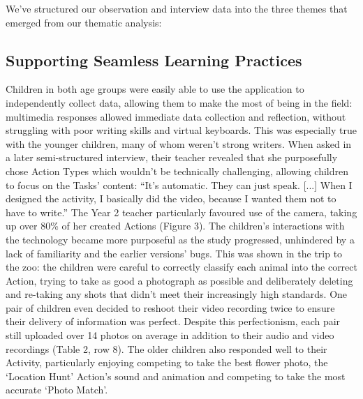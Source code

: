 We’ve structured our observation and interview data into the three themes that emerged from our thematic analysis:

\subsection{Supporting Seamless Learning Practices}

Children in both age groups were easily able to use the application to independently collect data, allowing them to make the most of being in the field: multimedia responses allowed immediate data collection and reflection, without struggling with poor writing skills and virtual keyboards. This was especially true with the younger children, many of whom weren’t strong writers. When asked in a later semi-structured interview, their teacher revealed that she purposefully chose Action Types which wouldn’t be technically challenging, allowing children to focus on the Tasks’ content: “It’s automatic. They can just speak. [...] When I designed the activity, I basically did the video, because I wanted them not to have to write.” The Year 2 teacher particularly favoured use of the camera, taking up over 80\% of her created Actions (Figure 3). The children’s interactions with the technology became more purposeful as the study progressed, unhindered by a lack of familiarity and the earlier versions’ bugs. This was shown in the trip to the zoo: the children were careful to correctly classify each animal into the correct Action, trying to take as good a photograph as possible and deliberately deleting and re-taking any shots that didn’t meet their increasingly high standards. One pair of children even decided to reshoot their video recording twice to ensure their delivery of information was perfect. Despite this perfectionism, each pair still uploaded over 14 photos on average in addition to their audio and video recordings (Table 2, row 8). The older children also responded well to their Activity, particularly enjoying competing to take the best flower photo, the ‘Location Hunt’ Action’s sound and animation and competing to take the most accurate ‘Photo Match’.

